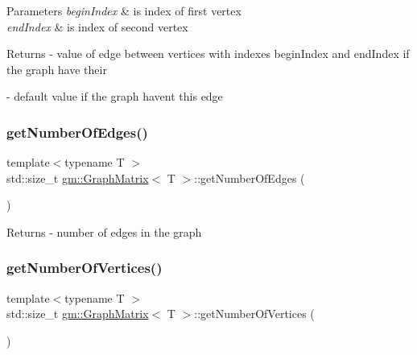 \begin{DoxyParams}{Parameters}
{\em begin\+Index} & is index of first vertex \\
\hline
{\em end\+Index} & is index of second vertex \\
\hline
\end{DoxyParams}
\begin{DoxyReturn}{Returns}
-\/ value of edge between vertices with indexes \textquotesingle{}begin\+Index\textquotesingle{} and \textquotesingle{}end\+Index\textquotesingle{} if the graph have their 

-\/ default value if the graph haven\textquotesingle{}t this edge 
\end{DoxyReturn}
\mbox{\label{classgm_1_1_graph_matrix_a4c240da5b6fb8ca0f0b65b179fcddf60}} 
\subsubsection{\texorpdfstring{get\+Number\+Of\+Edges()}{getNumberOfEdges()}}
{\footnotesize\ttfamily template$<$typename T $>$ \\
std\+::size\+\_\+t \mbox{\hyperlink{classgm_1_1_graph_matrix}{gm\+::\+Graph\+Matrix}}$<$ T $>$\+::get\+Number\+Of\+Edges (\begin{DoxyParamCaption}{ }\end{DoxyParamCaption})}

\begin{DoxyReturn}{Returns}
-\/ number of edges in the graph 
\end{DoxyReturn}
\mbox{\label{classgm_1_1_graph_matrix_a4efd9cd32511a16462cbbb22f9a5c37b}} 
\subsubsection{\texorpdfstring{get\+Number\+Of\+Vertices()}{getNumberOfVertices()}}
{\footnotesize\ttfamily template$<$typename T $>$ \\
std\+::size\+\_\+t \mbox{\hyperlink{classgm_1_1_graph_matrix}{gm\+::\+Graph\+Matrix}}$<$ T $>$\+::get\+Number\+Of\+Vertices (\begin{DoxyParamCaption}{ }\end{DoxyParamCaption})}

